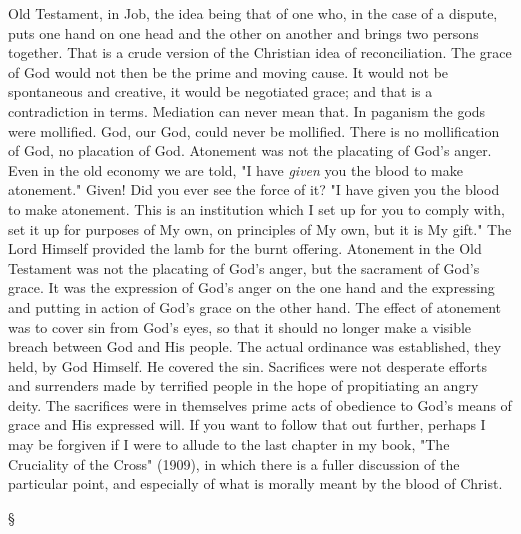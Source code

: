 \documentclass[12pt,a5paper,twoside,titlepage]{book}
\begin{document}
Old Testament, in Job, the idea being that of 
one who, in the case of a dispute, puts one hand 
on one head and the other on another and 
brings two persons together. That is a crude 
version of the Christian idea of reconciliation. 
The grace of God would not then be the prime 
and moving cause. It would not be spontaneous 
and creative, it would be negotiated grace; and 
that is a contradiction in terms. Mediation can 
never mean that. In paganism the gods were 
mollified. God, our God, could never be mollified. 
There is no mollification of God, no placation of 
God. Atonement was not the placating of God's 
anger. Even in the old economy we are told, "I 
have \textit{given} you the blood to make atonement." 
Given! Did you ever see the force of it? "I 
have given you the blood to make atonement. 
This is an institution which I set up for you to 
comply with, set it up for purposes of My own, 
on principles of My own, but it is My gift." The 
Lord Himself provided the lamb for the burnt 
offering. Atonement in the Old Testament was 
not the placating of God's anger, but the sacrament 
of God's grace. It was the expression 
of God's anger on the one hand and the expressing 
and putting in action of God's grace on the 
other hand. The effect of atonement was to 
cover sin from God's eyes, so that it should no 
longer make a visible breach between God and 
His people. The actual ordinance was established, 
they held, by God Himself. He covered 
the sin. Sacrifices were not desperate efforts and 
surrenders made by terrified people in the hope 
of propitiating an angry deity. The sacrifices 
were in themselves prime acts of obedience 
to God's means of grace and His expressed will. 
If you want to follow that out further, perhaps 
I may be forgiven if I were to allude to the 
last chapter in my book, "The Cruciality of 
the Cross" (1909), in which there is a fuller 
discussion of the particular point, and especially 
of what is morally meant by the blood of 
Christ. 

\begin{center}
\S
\end{center}
\end{document}
